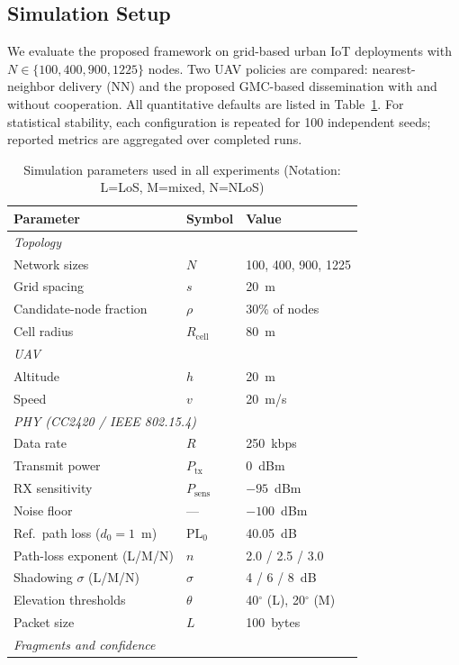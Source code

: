 \documentclass[conference]{IEEEtran}
\begin{document}
\subsection{Simulation Setup}
We evaluate the proposed framework on grid-based urban IoT deployments with
$N\in\{100,400,900,1225\}$ nodes. Two UAV policies are compared: nearest-neighbor
delivery (NN) and the proposed GMC-based dissemination with and without
cooperation. All quantitative defaults are listed in Table~\ref{tab:sim-params}. For statistical stability, each configuration is repeated for 100 independent
seeds; reported metrics are aggregated over completed runs.

\begin{table}[t]
\centering
\caption{Simulation parameters used in all experiments (Notation: L=LoS, M=mixed, N=NLoS)} 
\label{tab:sim-params}
\small
\begin{tabular}{lll}
\hline
Parameter & Symbol & Value \\
\hline
\multicolumn{3}{l}{\textit{Topology}} \\
Network sizes & \(N\) & 100, 400, 900, 1225 \\
Grid spacing & $s$ & 20~m \\
Candidate-node fraction & \(\rho\) & 30\% of nodes \\
Cell radius & $R_{\text{cell}}$ & 80~m \\
\hline
\multicolumn{3}{l}{\textit{UAV}} \\
Altitude & $h$ & 20~m \\
Speed & $v$ & 20~m/s \\
\hline
\multicolumn{3}{l}{\textit{PHY (CC2420 / IEEE 802.15.4)}} \\
Data rate & $R$ & 250~kbps \\
Transmit power & $P_{\text{tx}}$ & 0~dBm \\
RX sensitivity & $P_{\text{sens}}$ & $-95$~dBm \\
Noise floor & --- & $-100$~dBm \\
Ref.\ path loss ($d_0{=}1$~m) & $\mathrm{PL}_0$ & 40.05~dB \\
Path-loss exponent (L/M/N) & $n$ & 2.0 / 2.5 / 3.0 \\
Shadowing $\sigma$ (L/M/N) & $\sigma$ & 4 / 6 / 8~dB \\
Elevation thresholds & $\theta$ & 40$^\circ$ (L), 20$^\circ$ (M) \\
Packet size & $L$ & 100~bytes \\
\hline
\multicolumn{3}{l}{\textit{Fragments and confidence}} \\

\end{tabular}
\end{table}
\end{document}
